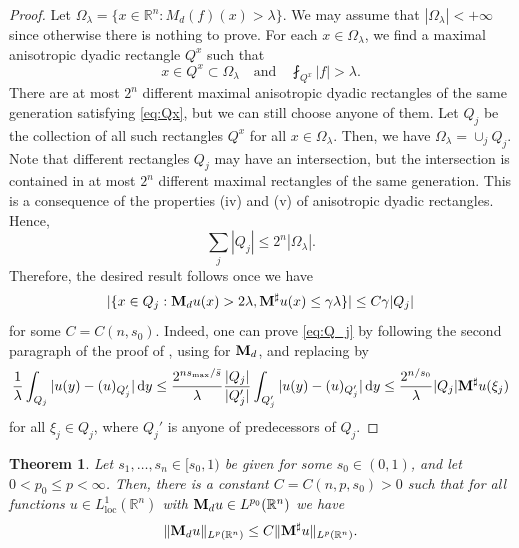 \documentclass[11pt]{amsart}
\theoremstyle{plain}
\newtheorem{theorem}{Theorem}[section]
\theoremstyle{definition}
\numberwithin{equation}{section}
\begin{document}
\begin{appendix}
\begin{proof}
Let $\Omega_\lambda = \lbrace x \in \mathbb{R}^n: M_d(f)(x) > \lambda \rbrace$. We may assume that $|\Omega_\lambda|<+\infty$ since otherwise there is nothing to prove. For each $x \in \Omega_\lambda$, we find a maximal anisotropic dyadic rectangle $Q^x$ such that
\begin{equation} \label{eq:Qx}
x \in Q^x \subset \Omega_\lambda \quad\text{and}\quad \fint_{Q^x} |f| > \lambda.
\end{equation}
There are at most $2^n$ different maximal anisotropic dyadic rectangles of the same generation satisfying \eqref{eq:Qx}, but we can still choose anyone of them. Let $Q_j$ be the collection of all such rectangles $Q^x$ for all $x \in \Omega_{\lambda}$. Then, we have $\Omega_\lambda = \cup_j Q_j$. Note that different rectangles $Q_j$ may have an intersection, but the intersection is contained in at most $2^n$ different maximal rectangles of the same generation. This is a consequence of the properties (iv) and (v) of anisotropic dyadic rectangles. Hence,
\begin{equation*}
\sum_{j} |Q_j| \leq 2^n |\Omega_\lambda|.
\end{equation*}
Therefore, the desired result follows once we have
\begin{equation} \label{eq:Q_j}
|\lbrace x \in Q_j: {\bf M}_d u(x) > 2\lambda, {\bf M}^{\sharp} u(x) \leq \gamma \lambda \rbrace| \leq C\gamma |Q_j|
\end{equation}
for some $C = C(n, s_0)$. Indeed, one can prove \eqref{eq:Q_j} by following the second paragraph of the proof of \cite[Theorem 3.4.4]{GrafakosMF}, using  for ${\bf M}_d$, and replacing \cite[Equation (3.4.8)]{GrafakosMF} by
\begin{equation*}
\frac{1}{\lambda} \int_{Q_j} |u(y) - (u)_{Q_j'}| \,\mathrm{d}y \leq \frac{2^{ns_{\max}/\bar{s}}}{\lambda} \frac{|Q_j|}{|Q_j'|} \int_{Q_j'} |u(y) - (u)_{Q_j'}| \,\mathrm{d}y \leq \frac{2^{n/s_0}}{\lambda} |Q_j| {\bf M}^{\sharp}u(\xi_j)
\end{equation*}
for all $\xi_j \in Q_j$, where $Q_j'$ is anyone of predecessors of $Q_j$.
\end{proof}

\begin{theorem} \label{thm:Md}
Let $s_1, \dots, s_n \in [s_0, 1)$ be given for some $s_0 \in (0,1)$, and let $0<p_0 \leq p<\infty$. Then, there is a constant $C = C(n, p, s_0) > 0$ such that for all functions $u \in L^1_{\mathrm{loc}}(\mathbb{R}^n)$ with ${\bf M}_du \in L^{p_0}(\mathbb{R}^n)$ we have
\begin{equation*}
\|{\bf M}_du\|_{L^p(\mathbb{R}^n)} \leq C\|{\bf M}^{\sharp}u \|_{L^p(\mathbb{R}^n)}.
\end{equation*}
\end{theorem}


\end{appendix}
\end{document}

